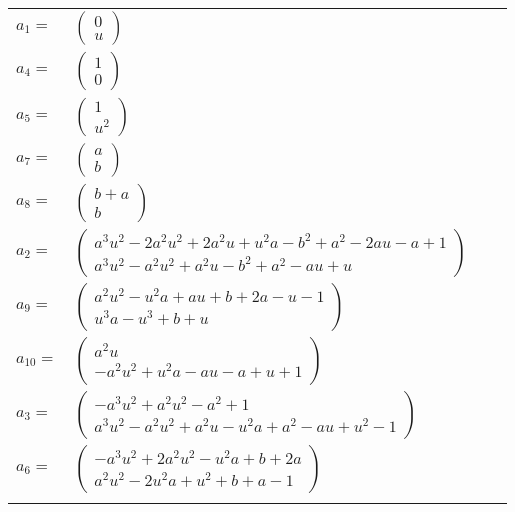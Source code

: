 \documentclass[1p]{elsarticle_modified}
\theoremstyle{definition}
\begin{document}
\begin{tabular}{m{7pt} m{180pt} m{7pt} m{180pt} }
\flushright $a_{1}=$&$\begin{pmatrix}0\\u\end{pmatrix}$ \\
\flushright $a_{4}=$&$\begin{pmatrix}1\\0\end{pmatrix}$ \\
\flushright $a_{5}=$&$\begin{pmatrix}1\\u^2\end{pmatrix}$ \\
\flushright $a_{7}=$&$\begin{pmatrix}a\\b\end{pmatrix}$ \\
\flushright $a_{8}=$&$\begin{pmatrix}b+a\\b\end{pmatrix}$ \\
\flushright $a_{2}=$&$\begin{pmatrix}a^3 u^2-2 a^2 u^2+2 a^2 u+u^2 a- b^2+a^2-2 a u- a+1\\a^3 u^2- a^2 u^2+a^2 u- b^2+a^2- a u+u\end{pmatrix}$ \\
\flushright $a_{9}=$&$\begin{pmatrix}a^2 u^2- u^2 a+a u+b+2 a- u-1\\u^3 a- u^3+b+u\end{pmatrix}$ \\
\flushright $a_{10}=$&$\begin{pmatrix}a^2 u\\- a^2 u^2+u^2 a- a u- a+u+1\end{pmatrix}$ \\
\flushright $a_{3}=$&$\begin{pmatrix}- a^3 u^2+a^2 u^2- a^2+1\\a^3 u^2- a^2 u^2+a^2 u- u^2 a+a^2- a u+u^2-1\end{pmatrix}$ \\
\flushright $a_{6}=$&$\begin{pmatrix}- a^3 u^2+2 a^2 u^2- u^2 a+b+2 a\\a^2 u^2-2 u^2 a+u^2+b+a-1\end{pmatrix}$\\&\end{tabular}
\end{document}

